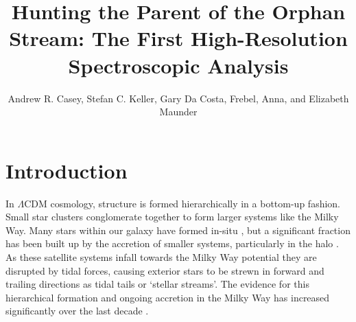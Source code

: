 \documentclass{emulateapj}
\begin{document}
\title{Hunting the Parent of the Orphan Stream: The First High-Resolution Spectroscopic Analysis}

\author{Andrew R. Casey, Stefan C. Keller, Gary Da Costa, Frebel, Anna, and Elizabeth Maunder}

\begin{abstract}



\end{abstract}


\section{Introduction}


In $\Lambda$CDM cosmology, structure is formed hierarchically in a bottom-up fashion. Small star clusters conglomerate together to form larger systems like the Milky Way. Many stars within our galaxy have formed in-situ \citep{ELS}, but a significant fraction has been built up by the accretion of smaller systems, particularly in the halo \citep{searle;zinn_1978}. As these satellite systems infall towards the Milky Way potential they are disrupted by tidal forces, causing exterior stars to be strewn in forward and trailing directions as tidal tails or `stellar streams'. The evidence for this hierarchical formation and ongoing accretion in the Milky Way has increased significantly over the last decade \citep{ibata;et-al_1994;belokurov;et-al_2006b}.
\end{document}
